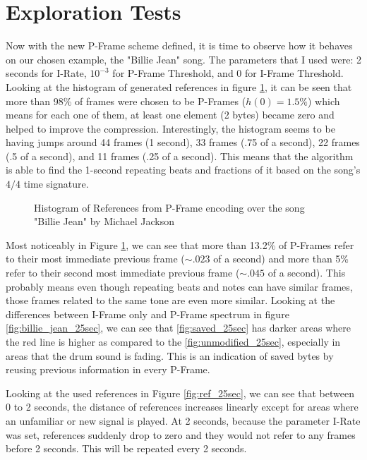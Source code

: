 \section{Exploration Tests}
\label{sec:tests}

Now with the new P-Frame scheme defined, it is time to observe how it behaves on our chosen example, the "Billie Jean" song. The parameters that I used were: 2 seconds for I-Rate, $10^{-3}$ for P-Frame Threshold, and 0 for I-Frame Threshold. Looking at the histogram of generated references in figure \ref{fig:hist}, it can be seen that more than 98\% of frames were chosen to be P-Frames ($h(0)=1.5\%$) which means for each one of them, at least one element (2 bytes) became zero and helped to improve the compression. Interestingly, the histogram seems to be having jumps around 44 frames (1 second), 33 frames (.75 of a second), 22 frames (.5 of a second), and 11 frames (.25 of a second). This means that the algorithm is able to find the 1-second repeating beats and fractions of it based on the song's $4/4$ time signature. 

\begin{figure}[ht] 
    \centering
    
    \caption{Histogram of References from P-Frame encoding over the song "Billie Jean" by Michael Jackson}
    \label{fig:hist}
\end{figure}

Most noticeably in Figure \ref{fig:hist}, we can see that more than 13.2\% of P-Frames refer to their most immediate previous frame ($\sim .023$ of a second) and more than 5\% refer to their second most immediate previous frame ($\sim .045$ of a second). This probably means even though repeating beats and notes can have similar frames, those frames related to the same tone are even more similar. Looking at the differences between I-Frame only and P-Frame spectrum in figure \ref{fig:billie_jean_25sec}, we can see that \ref{fig:saved_25sec} has darker areas where the red line is higher as compared to the \ref{fig:unmodified_25sec}, especially in areas that the drum sound is fading. This is an indication of saved bytes by reusing previous information in every P-Frame.

Looking at the used references in Figure \ref{fig:ref_25sec}, we can see that between 0 to 2 seconds, the distance of references increases linearly except for areas where an unfamiliar or new signal is played. At 2 seconds, because the parameter I-Rate was set, references suddenly drop to zero and they would not refer to any frames before 2 seconds. This will be repeated every 2 seconds.

